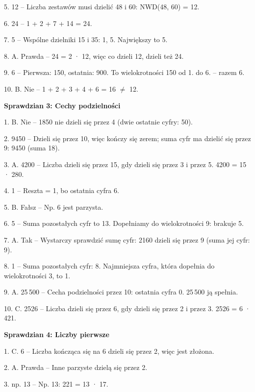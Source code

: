 5. 12 {\color{szary}– Liczba zestawów musi dzielić 48 i 60: NWD(48, 60) = 12.}\par
6. 24 {\color{szary}– 1 + 2 + 7 + 14 = 24.}\par
7. 5 {\color{szary}– Wspólne dzielniki 15 i 35: 1, 5. Największy to 5.}\par
8. A. Prawda {\color{szary}– 24 = 2 · 12, więc co dzieli 12, dzieli też 24.}\par
9. 6 {\color{szary}– Pierwsza: 150, ostatnia: 900. To wielokrotności 150 od 1. do 6. – razem 6.}\par
10. B. Nie {\color{szary}– 1 + 2 + 3 + 4 + 6 = 16 $\neq$ 12.}\par
\medskip
\textbf{\color{pomd}Sprawdzian 3: Cechy podzielności}\par
1. B. Nie {\color{szary}– 1850 nie dzieli się przez 4 (dwie ostatnie cyfry: 50).}\par
2. 9450 {\color{szary}– Dzieli się przez 10, więc kończy się zerem; suma cyfr ma dzielić się przez 9: 9450 (suma 18).}\par
3. A. 4200 {\color{szary}– Liczba dzieli się przez 15, gdy dzieli się przez 3 i przez 5. 4200 = 15 · 280.}\par
4. 1 {\color{szary}– Reszta = 1, bo ostatnia cyfra 6.}\par
5. B. Fałsz {\color{szary}– Np. 6 jest parzysta.}\par
6. 5 {\color{szary}– Suma pozostałych cyfr to 13. Dopełniamy do wielokrotności 9: brakuje 5.}\par
7. A. Tak {\color{szary}– Wystarczy sprawdzić sumę cyfr: 2160 dzieli się przez 9 (suma jej cyfr: 9).}\par
8. 1 {\color{szary}– Suma pozostałych cyfr: 8. Najmniejsza cyfra, która dopełnia do wielokrotności 3, to 1.}\par
9. A. 25\,500 {\color{szary}– Cecha podzielności przez 10: ostatnia cyfra 0. 25\,500 ją spełnia.}\par
10. C. 2526 {\color{szary}– Liczba dzieli się przez 6, gdy dzieli się przez 2 i przez 3. 2526 = 6 · 421.}\par
\medskip
\textbf{\color{pomd}Sprawdzian 4: Liczby pierwsze}\par
1. C. 6 {\color{szary}– Liczba kończąca się na 6 dzieli się przez 2, więc jest złożona.}\par
2. A. Prawda {\color{szary}– Inne parzyste dzielą się przez 2.}\par
3. np. 13 {\color{szary}– Np. 13: 221 = 13 · 17.}\par
